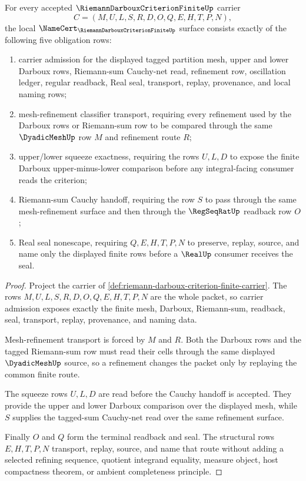 \begin{theorem}\label{thm:riemann-darboux-criterion-finite-obligations}
For every accepted $\RiemannDarbouxCriterionFiniteUp$ carrier
$$
C=(M,U,L,S,R,D,O,Q,E,H,T,P,N),
$$
the local $\NameCert_{\RiemannDarbouxCriterionFiniteUp}$ surface consists exactly of the following five obligation rows:
\begin{enumerate}
\item carrier admission for the displayed tagged partition mesh, upper and lower Darboux rows, Riemann-sum Cauchy-net read, refinement row, oscillation ledger, regular readback, Real seal, transport, replay, provenance, and local naming rows;
\item mesh-refinement classifier transport, requiring every refinement used by the Darboux rows or Riemann-sum row to be compared through the same $\DyadicMeshUp$ row $M$ and refinement route $R$;
\item upper/lower squeeze exactness, requiring the rows $U,L,D$ to expose the finite Darboux upper-minus-lower comparison before any integral-facing consumer reads the criterion;
\item Riemann-sum Cauchy handoff, requiring the row $S$ to pass through the same mesh-refinement surface and then through the $\RegSeqRatUp$ readback row $O$;
\item Real seal nonescape, requiring $Q,E,H,T,P,N$ to preserve, replay, source, and name only the displayed finite rows before a $\RealUp$ consumer receives the seal.
\end{enumerate}
\end{theorem}
\begin{proof}
Project the carrier of \autoref{def:riemann-darboux-criterion-finite-carrier}. The rows $M,U,L,S,R,D,O,Q,E,H,T,P,N$ are the whole packet, so carrier admission exposes exactly the finite mesh, Darboux, Riemann-sum, readback, seal, transport, replay, provenance, and naming data.

Mesh-refinement transport is forced by $M$ and $R$. Both the Darboux rows and the tagged Riemann-sum row must read their cells through the same displayed $\DyadicMeshUp$ source, so a refinement changes the packet only by replaying the common finite route.

The squeeze rows $U,L,D$ are read before the Cauchy handoff is accepted. They provide the upper and lower Darboux comparison over the displayed mesh, while $S$ supplies the tagged-sum Cauchy-net read over the same refinement surface.

Finally $O$ and $Q$ form the terminal readback and seal. The structural rows $E,H,T,P,N$ transport, replay, source, and name that route without adding a selected refining sequence, quotient integrand equality, measure object, host compactness theorem, or ambient completeness principle.
\end{proof}

